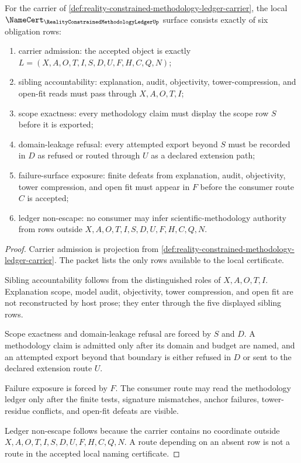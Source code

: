 \begin{theorem}
\label{thm:reality-constrained-methodology-ledger-namecert-obligations}
For the carrier of \autoref{def:reality-constrained-methodology-ledger-carrier}, the local $\NameCert_{\RealityConstrainedMethodologyLedgerUp}$ surface consists exactly of six obligation rows:
\begin{enumerate}
\item carrier admission: the accepted object is exactly $L=(X,A,O,T,I,S,D,U,F,H,C,Q,N)$;
\item sibling accountability: explanation, audit, objectivity, tower-compression, and open-fit reads must pass through $X,A,O,T,I$;
\item scope exactness: every methodology claim must display the scope row $S$ before it is exported;
\item domain-leakage refusal: every attempted export beyond $S$ must be recorded in $D$ as refused or routed through $U$ as a declared extension path;
\item failure-surface exposure: finite defeats from explanation, audit, objectivity, tower compression, and open fit must appear in $F$ before the consumer route $C$ is accepted;
\item ledger non-escape: no consumer may infer scientific-methodology authority from rows outside $X,A,O,T,I,S,D,U,F,H,C,Q,N$.
\end{enumerate}
\end{theorem}
\begin{proof}
Carrier admission is projection from \autoref{def:reality-constrained-methodology-ledger-carrier}. The packet lists the only rows available to the local certificate.

Sibling accountability follows from the distinguished roles of $X,A,O,T,I$. Explanation scope, model audit, objectivity, tower compression, and open fit are not reconstructed by host prose; they enter through the five displayed sibling rows.

Scope exactness and domain-leakage refusal are forced by $S$ and $D$. A methodology claim is admitted only after its domain and budget are named, and an attempted export beyond that boundary is either refused in $D$ or sent to the declared extension route $U$.

Failure exposure is forced by $F$. The consumer route may read the methodology ledger only after the finite tests, signature mismatches, anchor failures, tower-residue conflicts, and open-fit defeats are visible.

Ledger non-escape follows because the carrier contains no coordinate outside $X,A,O,T,I,S,D,U,F,H,C,Q,N$. A route depending on an absent row is not a route in the accepted local naming certificate.
\end{proof}

